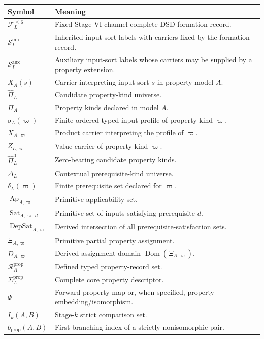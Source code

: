 \documentclass[11pt]{article}
\newcommand{\FVI}{\mathcal F_{L}^{\le 6}}
\newcommand{\Sin}{\mathcal S_{L}^{\mathrm{inh}}}
\newcommand{\Saux}{\mathcal S_{L}^{\mathrm{aux}}}
\newcommand{\Pihat}{\widehat{\Pi}_{L}}
\newcommand{\PiZero}{\widehat{\Pi}_{L}^{0}}
\newcommand{\Dep}{\Delta_{L}}
\newcommand{\Ap}{\operatorname{Ap}}
\newcommand{\DepSat}{\operatorname{DepSat}}
\newcommand{\Sat}{\operatorname{Sat}}
\newcommand{\Dom}{\operatorname{Dom}}
\newcommand{\PropRec}{\mathcal R^{\mathrm{prop}}}
\theoremstyle{definition}
\theoremstyle{remark}
\begin{document}
\begin{tabularx}{\textwidth}{@{}>{\raggedright\arraybackslash}p{}X@{}}
\toprule
Symbol & Meaning\\
\midrule
\(\FVI\) & Fixed Stage-VI channel-complete DSD formation record.\\
\(\Sin\) & Inherited input-sort labels with carriers fixed by the formation record.\\
\(\Saux\) & Auxiliary input-sort labels whose carriers may be supplied by a property extension.\\
\(X_A(s)\) & Carrier interpreting input sort \(s\) in property model \(A\).\\
\(\Pihat\) & Candidate property-kind universe.\\
\(\Pi_A\) & Property kinds declared in model \(A\).\\
\(\sigma_L(\varpi)\) & Finite ordered typed input profile of property kind \(\varpi\).\\
\(X_{A,\varpi}\) & Product carrier interpreting the profile of \(\varpi\).\\
\(Z_{L,\varpi}\) & Value carrier of property kind \(\varpi\).\\
\(\PiZero\) & Zero-bearing candidate property kinds.\\
\(\Dep\) & Contextual prerequisite-kind universe.\\
\(\delta_L(\varpi)\) & Finite prerequisite set declared for \(\varpi\).\\
\(\Ap_{A,\varpi}\) & Primitive applicability set.\\
\(\Sat_{A,\varpi,d}\) & Primitive set of inputs satisfying prerequisite \(d\).\\
\(\DepSat_{A,\varpi}\) & Derived intersection of all prerequisite-satisfaction sets.\\
\(\Xi_{A,\varpi}\) & Primitive partial property assignment.\\
\(D_{A,\varpi}\) & Derived assignment domain \(\Dom(\Xi_{A,\varpi})\).\\
\(\PropRec_A\) & Defined typed property-record set.\\
\(\Sigma_A^{\mathrm{prop}}\) & Complete core property descriptor.\\
\(\Phi\) & Forward property map or, when specified, property embedding/isomorphism.\\
\(I_k(A,B)\) & Stage-\(k\) strict comparison set.\\
\(b_{\mathrm{prop}}(A,B)\) & First branching index of a strictly nonisomorphic pair.\\
\bottomrule
\end{tabularx}
\end{document}
